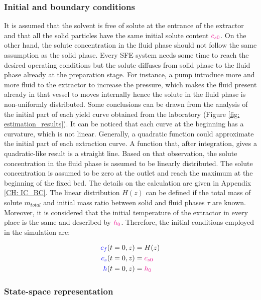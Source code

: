 \documentclass[../Article_Model_Parameters.tex]{subfiles}
\begin{document}
		\subsubsection{Initial and boundary conditions} 
		It is assumed that the solvent is free of solute at the entrance of the extractor and that all the solid particles have the same initial solute content ${\color{magenta}c_{s0}}$. On the other hand, the solute concentration in the fluid phase should not follow the same assumption as the solid phase. Every SFE system needs some time to reach the desired operating conditions but the solute diffuses from solid phase to the fluid phase already at the preparation stage. For instance, a pump introduce more and more fluid to the extractor to increase the pressure, which makes the fluid present already in that vessel to moves internally hence the solute in the fluid phase is non-uniformly distributed. Some conclusions can be drawn from the analysis of the initial part of each yield curve obtained from the laboratory (Figure \ref{fig: estimation_results}). It can be noticed that each curve at the beginning has a curvature, which is not linear. Generally, a quadratic function could approximate the initial part of each extraction curve. A function that, after integration, gives a quadratic-like result is a straight line. Based on that observation, the solute concentration in the fluid phase is assumed to be linearly distributed. The solute concentration is assumed to be zero at the outlet and reach the maximum at the beginning of the fixed bed. The details on the calculation are given in Appendix \ref{CH: IC_BC}. The linear distribution $H(z)$ can be defined if the total mass of solute $m_{total}$ and initial mass ratio between solid and fluid phases $\tau$ are known.
		Moreover, it is considered that the initial temperature of the extractor in every place is the same and described by ${\color{magenta}h_0}$. Therefore, the initial conditions employed in the simulation are:
			
		{\footnotesize
			\begin{subequations}
				\begin{align*}
					{\color{blue}c_f}(t = 0, z) &= H(z)   \\
					{\color{blue}c_s}(t = 0, z) &= {\color{magenta}c_{s0}} \\
					{\color{blue}h}(t = 0, z) &= {\color{magenta}h_0}
				\end{align*}
		\end{subequations} }
	
		\subsubsection{State-space representation} \label{CH: State_space}
			
\end{document}
